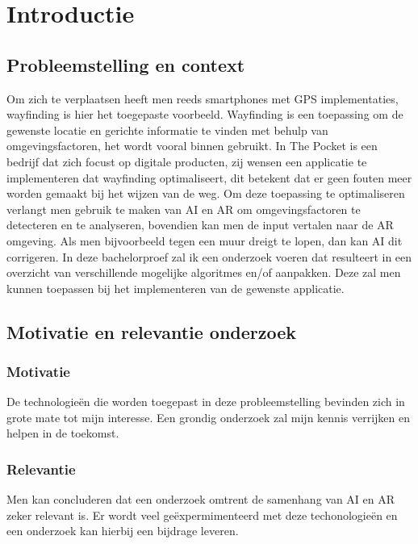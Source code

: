 \section{Introductie} %
\label{sec:introductie}
\subsection{Probleemstelling en context}
Om zich te verplaatsen heeft men reeds smartphones met GPS implementaties, wayfinding is hier het toegepaste voorbeeld. Wayfinding is een toepassing om de gewenste locatie en gerichte informatie te vinden met behulp van omgevingsfactoren, het wordt vooral binnen gebruikt. In The Pocket is een bedrijf dat zich focust op digitale producten, zij wensen een applicatie te implementeren dat wayfinding optimaliseert, dit betekent dat er geen fouten meer worden gemaakt bij het wijzen van de weg. 
Om deze toepassing te optimaliseren verlangt men gebruik te maken van AI en AR om omgevingsfactoren te detecteren en te analyseren, bovendien kan men de input vertalen naar de AR omgeving. Als men bijvoorbeeld tegen een muur dreigt te lopen, dan kan AI dit corrigeren.
In deze bachelorproef zal ik een onderzoek voeren dat resulteert in een overzicht van verschillende mogelijke algoritmes en/of aanpakken. Deze zal men kunnen toepassen bij het implementeren van de gewenste applicatie.

\subsection{Motivatie en relevantie onderzoek}
\subsubsection{Motivatie}
De technologieën die worden toegepast in deze probleemstelling bevinden zich in grote mate tot mijn interesse. Een grondig onderzoek zal mijn kennis verrijken en helpen in de toekomst. 
\subsubsection{Relevantie}
Men kan concluderen dat een onderzoek omtrent de samenhang van AI en AR  zeker relevant is. Er wordt veel geëxpermimenteerd met deze techonologieën en een onderzoek kan hierbij een bijdrage leveren.

